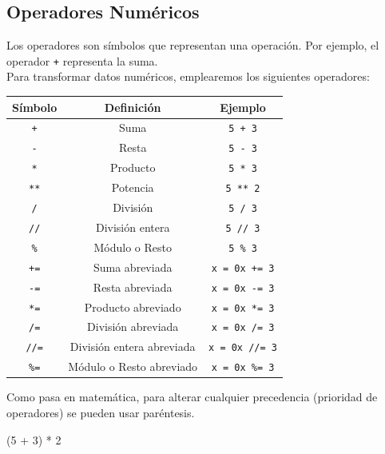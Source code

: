 \documentclass[
  letterpaper,
  DIV=11,
  numbers=noendperiod]{scrreprt}
\newenvironment{Shaded}{\begin{snugshade}}{\end{snugshade}}
\newcommand{\DecValTok}[1]{\textcolor[rgb]{0.68,0.00,0.00}{#1}}
\newcommand{\NormalTok}[1]{\textcolor[rgb]{0.00,0.23,0.31}{#1}}
\newcommand{\OperatorTok}[1]{\textcolor[rgb]{0.37,0.37,0.37}{#1}}
\begin{document}
\hypertarget{operadores-numuxe9ricos}{%
\subsection{Operadores Numéricos}\label{operadores-numuxe9ricos}}

Los operadores son símbolos que representan una operación. Por ejemplo,
el operador \texttt{+} representa la suma.\\

Para transformar datos numéricos, emplearemos los siguientes operadores:

\begin{longtable}[]{@{}ccc@{}}
\toprule\noalign{}
Símbolo & Definición & Ejemplo \\
\midrule\noalign{}
\endhead
\bottomrule\noalign{}
\endlastfoot
\texttt{+} & Suma & \texttt{5\ +\ 3} \\
\texttt{-} & Resta & \texttt{5\ -\ 3} \\
\texttt{*} & Producto & \texttt{5\ *\ 3} \\
\texttt{**} & Potencia & \texttt{5\ **\ 2} \\
\texttt{/} & División & \texttt{5\ /\ 3} \\
\texttt{//} & División entera & \texttt{5\ //\ 3} \\
\texttt{\%} & Módulo o Resto & \texttt{5\ \%\ 3} \\
\texttt{+=} & Suma abreviada & \texttt{x\ =\ 0}\texttt{x\ +=\ 3} \\
\texttt{-=} & Resta abreviada & \texttt{x\ =\ 0}\texttt{x\ -=\ 3} \\
\texttt{*=} & Producto abreviado & \texttt{x\ =\ 0}\texttt{x\ *=\ 3} \\
\texttt{/=} & División abreviada & \texttt{x\ =\ 0}\texttt{x\ /=\ 3} \\
\texttt{//=} & División entera abreviada &
\texttt{x\ =\ 0}\texttt{x\ //=\ 3} \\
\texttt{\%=} & Módulo o Resto abreviado &
\texttt{x\ =\ 0}\texttt{x\ \%=\ 3} \\
\end{longtable}

Como pasa en matemática, para alterar cualquier precedencia (prioridad
de operadores) se pueden usar paréntesis.

\begin{Shaded}
\begin{Highlighting}[]
\NormalTok{(}\DecValTok{5} \OperatorTok{+} \DecValTok{3}\NormalTok{) }\OperatorTok{*} \DecValTok{2}
\end{Highlighting}
\end{Shaded}
\end{document}

